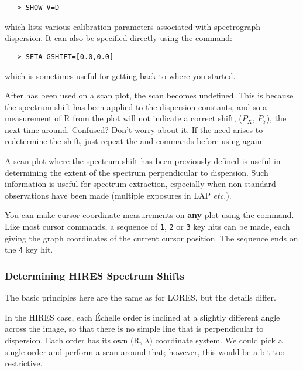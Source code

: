 \begin{verbatim}
   > SHOW V=D
\end{verbatim}

which lists various calibration parameters associated with
spectrograph dispersion.  It can also be specified directly using the
 command:

\begin{verbatim}
   > SETA GSHIFT=[0.0,0.0]
\end{verbatim}

which is sometimes useful for getting back to where you started.

After 
 has been used on a scan plot, the scan becomes undefined.
This is because the spectrum shift has been applied to the dispersion
constants, and so a measurement of R from the plot will not indicate a
correct shift, ($P_{X}$, $P_{Y}$), the next time around.  Confused? Don't
worry about it.  If the need arises to redetermine the shift, just repeat the
 and 
 commands before using  again.

A scan plot where the spectrum shift has been previously defined is useful
in determining the extent of the spectrum perpendicular to dispersion.  Such
information is useful for spectrum extraction, especially when
non-standard observations have been made (multiple exposures in LAP
{\it etc.})\@.

You can make cursor coordinate measurements on {\bf any} plot using the
 command.  Like most cursor commands, a sequence of \verb+1+,
\verb+2+ or \verb+3+ key hits can be made, each giving the graph coordinates of
the current cursor position.  The sequence ends on the \verb+4+ key hit.

\subsubsection{Determining HIRES Spectrum Shifts}

The basic principles here are the same as for LORES, but the details differ.

In the HIRES case, each \'{E}chelle order is inclined at a slightly different
angle across the image, so that there is no simple line that is perpendicular
to dispersion.  Each order has its own (R, $\lambda$) coordinate system.  We
could pick a single order and perform a scan around that; however, this would
be a bit too restrictive.


